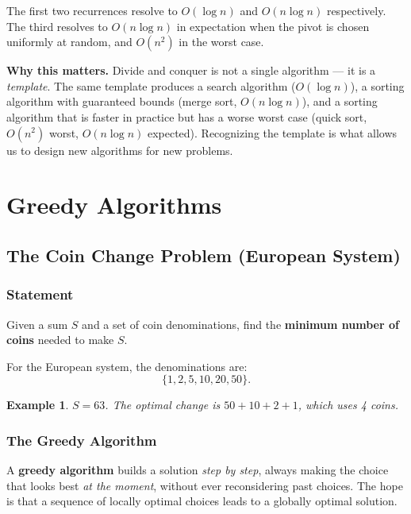 \documentclass[11pt,a4paper]{article}
\newtheorem{example}[theorem]{Example}
\begin{document}
The first two recurrences resolve to $O(\log n)$ and $O(n \log n)$ respectively. The third resolves to $O(n \log n)$ in expectation when the pivot is chosen uniformly at random, and $O(n^2)$ in the worst case.

\textbf{Why this matters.} Divide and conquer is not a single algorithm --- it is a \emph{template}. The same template produces a search algorithm ($O(\log n)$), a sorting algorithm with guaranteed bounds (merge sort, $O(n \log n)$), and a sorting algorithm that is faster in practice but has a worse worst case (quick sort, $O(n^2)$ worst, $O(n \log n)$ expected). Recognizing the template is what allows us to design new algorithms for new problems.

\section{Greedy Algorithms}

\subsection{The Coin Change Problem (European System)}

\subsubsection{Statement}

Given a sum \( S \) and a set of coin denominations, find the \textbf{minimum number of coins} needed to make \( S \).

For the European system, the denominations are:
\[
\{1, 2, 5, 10, 20, 50\}.
\]

\begin{example}
\( S = 63 \). The optimal change is \( 50 + 10 + 2 + 1 \), which uses 4 coins.
\end{example}

\subsubsection{The Greedy Algorithm}

A \textbf{greedy algorithm} builds a solution \emph{step by step}, always making the choice that looks best \emph{at the moment}, without ever reconsidering past choices. The hope is that a sequence of locally optimal choices leads to a globally optimal solution.
\end{document}
